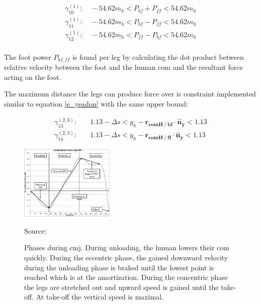 \documentclass[default,iicol]{sn-jnl}
\begin{document}
{\begin{equation}
    \begin{array}{c}
         \gamma_{10}^{(1)}:\quad  -54.62 m_h < P_{bf} + P_{ff} < 54.62 m_h  \\
         \gamma_{11}^{(1)}:\quad  -54.62 m_h < P_{bf} - P_{ff} < 54.62 m_h  \\
         \gamma_{12}^{(1)}:\quad  -54.62 m_h < P_{ff} - P_{bf} < 54.62 m_h  \\
    \end{array}
\end{equation}

The foot power $P_{bf,ff}$ is found per leg by calculating the dot product between relative velocity between the foot and the human \gls{com} and the resultant force acting on the foot. 

The maximum distance the legs can produce force over is constraint implemented similar to equation \ref{e_yeadon} with the same upper bound:

\begin{equation}
\begin{split}
        \gamma_{13}^{(2,3)}:& \quad  1.13-\Delta s < y_h - \mathbf{r_{comH \mathbin{/} bf}} \cdot \mathbf{\hat n_y} < 1.13 \\ 
      \gamma_{14}^{(2,3)}:& \quad  1.13-\Delta s < y_h - \mathbf{r_{comH \mathbin{/} ff}} \cdot \mathbf{\hat n_y} < 1.13 
      \end{split}
\end{equation}

\begin{figure}
    \centering
    \includegraphics[width=0.4\textwidth]{figure/countermovementjumpRFD.jpg}
    \caption[Ground reaction force of CMJ]{Phases during \gls{cmj}. During unloading, the human lowers their \gls{com} quickly. During the eccentric phase, the gained downward velocity during the unloading phase is braked until the lowest point is reached which is at the amortization. During the concentric phase the legs are stretched out and upward speed is gained until the take-off. At take-off the vertical speed is maximal.}
    \centering \footnotesize Source: \cite{barker_relationships_2018}%
    \label{f_cmj}
\end{figure}

}
\end{document}
